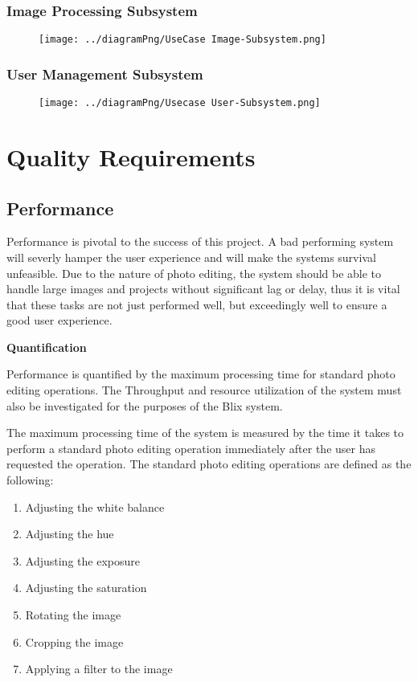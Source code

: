 \documentclass[11pt,a4paper]{article}
\begin{document}
\pagebreak
\subsubsection*{Image Processing Subsystem}
\begin{figure}[htbp]
    \centering
    \texttt{[image: ../diagramPng/UseCase Image-Subsystem.png]}
\end{figure}

\subsubsection*{User Management Subsystem}
\begin{figure}[htbp]
    \centering
    \texttt{[image: ../diagramPng/Usecase User-Subsystem.png]}
\end{figure}


\pagebreak

\section*{Quality Requirements}

\subsection*{Performance}

Performance is pivotal to the success of this project. A bad performing system
will severly hamper the user experience and will make the systems survival unfeasible.
Due to the nature of photo editing, the system should be able to handle large
images and projects without significant lag or delay, thus it is vital that these tasks are
not just performed well, but exceedingly well to ensure a good user experience.

    {\bf Quantification}

Performance is quantified by the maximum processing time for standard photo editing operations.
The Throughput and resource utilization of the system must also be investigated for the purposes
of the Blix system.

The maximum processing time of the system is measured by the time it takes to perform a standard photo editing operation
immediately after the user has requested the operation. The standard photo editing operations are defined as the following:
\begin{enumerate}
    \item Adjusting the white balance
    \item Adjusting the hue
    \item Adjusting the exposure
    \item Adjusting the saturation
    \item Rotating the image
    \item Cropping the image
    \item Applying a filter to the image
\end{enumerate}
\end{document}
